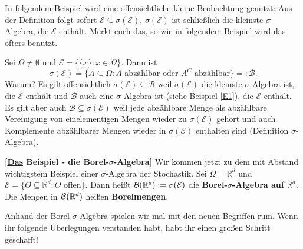 In folgendem Beispiel wird eine offensichtliche kleine Beobachtung genutzt: Aus der Definition folgt sofort $\mathcal E\subseteq \sigma(\mathcal E)$, $\sigma(\mathcal E)$ ist schlie\ss lich die kleinste $\sigma$-Algebra, die $\mathcal E$ enth\"alt. Merkt euch das, so wie in folgendem Beispiel wird das \"ofters benutzt.
\begin{beispiel}\label{bspd} 
	Sei $\Omega \neq \emptyset$ und $\mathcal E=\{ \{ x \} \! : x\in \Omega \}$. Dann ist \[ \sigma(\mathcal E)= \{ A \subseteq \Omega \! : \text{$A$ abzählbar oder $A^C$ abzählbar}\}=:\mathcal B . \]
	Warum? Es gilt offensichtlich $\sigma(\mathcal E) \subseteq \mathcal B$ weil $\sigma(\mathcal E)$ die kleinste $\sigma$-Algebra ist, die $\mathcal E$ enth\"alt und $\mathcal B$ auch eine $\sigma$-Algebra ist (siehe Beispiel \ref{E1}), die $\mathcal E$ enth\"alt. Es gilt aber auch $\mathcal B \subseteq \sigma(\mathcal E)$ weil jede abzählbare Menge als abzählbare Vereinigung von einelementigen Mengen wieder zu $\sigma(\mathcal E)$ gehört und auch Komplemente abzählbarer Mengen wieder in $\sigma(\mathcal E)$ enthalten sind (Definition $\sigma$-Algebra).
\end{beispiel}

\begin{beispiel}\label{bsp:borel}  \textbf{[\underline{Das} Beispiel - die Borel-$\sigma$-Algebra]}
Wir kommen jetzt zu dem mit Abstand wichtigstem Beispiel einer $\sigma$-Algebra der Stochastik. Sei $\Omega = \mathbb{R}^d$ und $\mathcal E = \{ O \subseteq \mathbb{R}^d \! : O \text{ offen} \}$. Dann heißt $\mathcal{B}(\mathbb{R}^d):= \sigma(\mathcal E)$ die \textbf{Borel-$\sigma$-Algebra auf $\mathbb{R}^d$}. Die Mengen in $\mathcal{B}(\mathbb{R}^d)$ hei\ss en \textbf{Borelmengen}.
\end{beispiel}
Anhand der Borel-$\sigma$-Algebra spielen wir mal mit den neuen Begriffen rum. Wenn ihr folgende \"Uberlegungen verstanden habt, habt ihr einen gro\ss en Schritt geschafft! \smallskip

